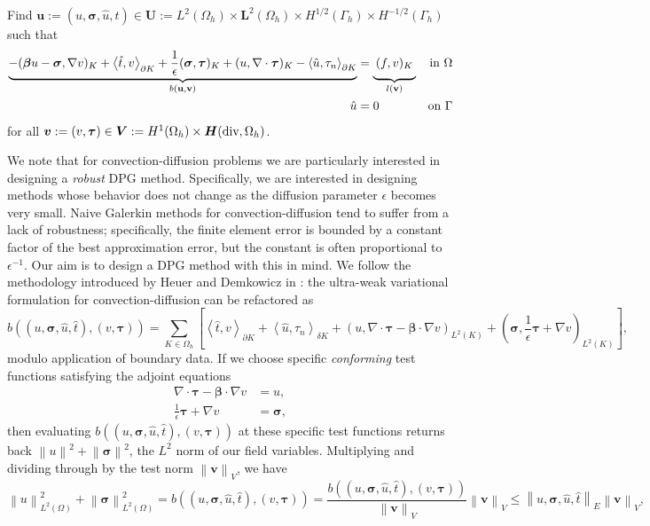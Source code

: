 \documentclass[letterpaper]{article}
\def\btau{\boldsymbol\tau}
\def\bftau{\boldsymbol\tau}
\def\bfsigma{\boldsymbol\sigma}
\def\bbeta{\boldsymbol\beta}
\newcommand{\bs}[1]{\boldsymbol{#1}}
\newcommand{\norm}[1]{\left\| #1 \right\|}
\newcommand{\LRp}[1]{\left( #1 \right)}
\newcommand{\LRs}[1]{\left[ #1 \right]}
\newcommand{\LRa}[1]{\left\langle #1 \right\rangle}
\newcommand{\uh}{\widehat{u}}
\renewcommand{\L}{L^2\LRp{\Omega}}
\newcommand{\Oh}{\Omega_h}
\newcommand{\bfv}{\boldsymbol v}
\newcommand{\bfH}{\mbox{\boldmath $H$}}
\newcommand{\grad}{\nabla}
\renewcommand{\div}{\grad \cdot}
\begin{document}
Find
$\bs u:=(u,\bfsigma,\hat u,\hat t)
\in\bs U:=L^2(\Omega_h)\times \bs L^2(\Omega_h)\times H^{1/2}(\Gamma_h)\times H^{-1/2}(\Gamma_h)$
such that
\begin{align}
\label{eq:variationalFormulation}
\underbrace{-(\bbeta u-\bfsigma,\nabla v)_K+\LRa{\hat t,v}_{\partial K}
+ \frac{1}{\epsilon}(\bfsigma,\btau)_K
+(u,\nabla\cdot\btau)_K
-\LRa{\hat u,\tau_n}_{\partial K}}_{b(\mathbf{u}, \mathbf{v})}
&=\underbrace{\:(f,v)_K\genfrac{}{}{0pt}{}{}{}}_{l(\mathbf{v})} &\text{in }\Omega \\
\hat u&=0 &\text{on }\Gamma
\end{align}
for all $\bs v:=(v,\btau)\in
\bs V:=H^1(\Omega_h)\times\bfH(\text{div},\Omega_h)$.


We note that for convection-diffusion problems we are particularly
interested in designing a \textit{robust} DPG method.  Specifically, we are
interested in designing methods whose behavior does not change as the
diffusion parameter $\epsilon$ becomes very small.  Naive Galerkin methods for
convection-diffusion tend to suffer from a lack of robustness; specifically,
the finite element error is bounded by a constant factor of the best
approximation error, but the constant is often proportional to
$\epsilon^{-1}$.  Our aim is to design a DPG method with this in mind.  We
follow the methodology introduced by Heuer and Demkowicz in
\cite{DemkowiczHeuer}: the ultra-weak variational formulation for
convection-diffusion can be refactored as
\[
b\LRp{\LRp{u,\bfsigma,\uh,\hat t},\LRp{v,\bftau}} =
\sum_{K\in \Oh}\LRs{\LRa{\hat t,v}_{\partial K}
+\LRa{\uh,\tau_n}_{\delta K} + \LRp{u,\div \bftau
-\bbeta\cdot\grad v}_{L^2(K)}
+\LRp{\bfsigma,\frac{1}{\epsilon} \bftau + \grad v}_{L^2(K)}},
\]
modulo application of boundary data.  If we choose specific
\textit{conforming} test functions satisfying the adjoint equations
\begin{align*}
\div \bftau - \bbeta \cdot \grad v &= u,\\
\frac{1}{\epsilon} \bftau + \grad v &= \bfsigma,
\end{align*}
then evaluating $b\LRp{\LRp{u,\bfsigma,\uh,\hat t},\LRp{v,\bftau}}$ at these
specific test functions returns back $\norm{u}^2 + \norm{\bfsigma}^2$, the $L^2$
norm of our field variables.  Multiplying and dividing through by the test
norm $\norm{\bfv}_V$, we have
\[
\norm{u}_{\L}^2 + \norm{\bfsigma}_{\L}^2 =
b\LRp{\LRp{u,\bfsigma,\uh,\hat t},\LRp{v,\bftau}} =
\frac{b\LRp{\LRp{u,\bfsigma,\uh,\hat t},\LRp{v,\bftau}}}{\norm{\bfv}_V}\norm{\bfv}_V
\leq \norm{u,\bfsigma,\uh,\hat t}_E\norm{\bfv}_V,
\]
\end{document}
